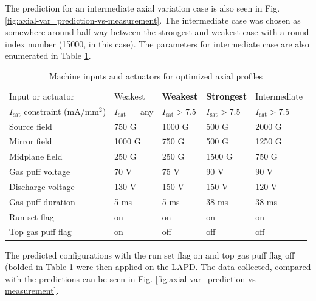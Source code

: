 
The prediction for an intermediate axial variation case is also seen in Fig. \ref{fig:axial-var_prediction-vs-measurement}. The intermediate case was chosen as somewhere around half way between the strongest and weakest case with a round index number (15000, in this case). The parameters for intermediate case are also enumerated in Table \ref{tab:axial_optimization_results}. 

\begin{table}
	\small
	\centering
	\caption{Machine inputs and actuators for optimized axial profiles}
	\label{tab:axial_optimization_results}
	\begin{tabular}{p{1.8 in} | p{0.75 in} p{0.75 in} p{0.75 in} p{0.8 in}}
		Input or actuator & Weakest & \textbf{Weakest} & \textbf{Strongest} & Intermediate \\
		$I_\text{sat}$ constraint (mA/mm$^2$) & $I_\text{sat} = $ any & $I_\text{sat}>7.5$ & $I_\text{sat}>7.5$ & $I_\text{sat}>7.5$\\
		\hline
		Source field      & 750 G   & 1000 G   & 500 G 	& 2000 G \\
		Mirror field      & 1000 G  & 750 G    & 500 G 	& 1250 G \\
		Midplane field    & 250 G   & 250 G    & 1500 G & 750 G \\
		Gas puff voltage  & 70 V    & 75 V     & 90 V 	& 90 V \\
		Discharge voltage & 130 V   & 150 V    & 150 V 	& 120 V \\
		Gas puff duration & 5 ms    & 5 ms     & 38 ms 	& 38 ms \\
		Run set flag      & on      & on       & on 	& on \\
		Top gas puff flag & on      & off      & off 	& off \\
	\end{tabular}
\end{table}

The predicted configurations with the run set flag on and top gas puff flag off (bolded in Table \ref{tab:axial_optimization_results} were then applied on the LAPD. The data collected, compared with the predictions can be seen in Fig. \ref{fig:axial-var_prediction-vs-measurement}.

